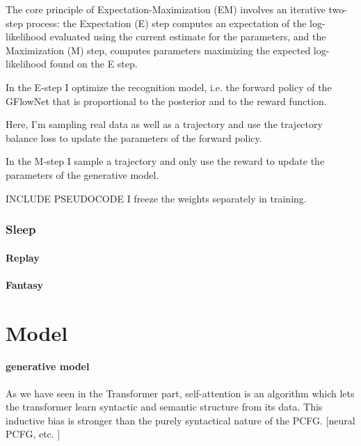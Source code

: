 The core principle of Expectation-Maximization (EM) involves an iterative two-step process: the Expectation (E) step computes an expectation of the log-likelihood evaluated using the current estimate for the parameters, and the Maximization (M) step, computes parameters maximizing the expected log-likelihood found on the E step.

In the E-step I optimize the recognition model, i.e. the forward policy of the GFlowNet that is proportional to the posterior and to the reward function. 

Here, I'm sampling real data as well as a trajectory and use the trajectory balance loss to update the parameters of the forward policy.

In the M-step I sample a trajectory and only use the reward to update the parameters of the generative model.


INCLUDE PSEUDOCODE
I freeze the weights separately in training. 

\subsubsection{Sleep}
\paragraph{Replay}
\paragraph{Fantasy}






\section{Model}


\paragraph{generative model}
As we have seen in the Transformer part, self-attention is an algorithm which lets the transformer learn syntactic and semantic structure from its data. This inductive bias is stronger than the purely syntactical nature of the PCFG.
[neural PCFG, etc. ]

